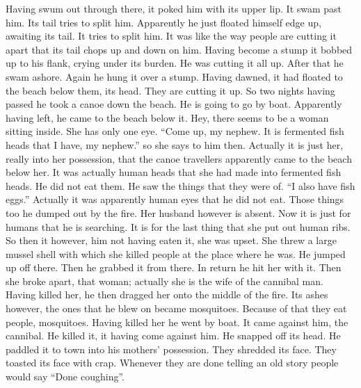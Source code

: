 \begin{pairs}
\begin{Rightside}
Having swum out through there, it poked him with its upper lip.
It swam past him.
Its tail tries to split him.
Apparently he just floated himself edge up, awaiting its tail.
It tries to split him.
It was like the way people are cutting it apart that its tail chops up and down on him.
Having become a stump it bobbed up to his flank, crying under its burden.
He was cutting it all up.
After that he swam ashore.
Again he hung it over a stump.
Having dawned, it had floated to the beach below them, its head.
They are cutting it up.
\pend
\pstart
{}So two nights having passed he took a canoe down the beach.
He is going to go by boat.
Apparently having left, he came to the beach below it.
Hey, there seems to be a woman sitting inside.
She has only one eye.
\qqk{}“Come up, my nephew.
It is fermented fish heads that I have, my nephew.”
so she says to him then.
Actually it is just her, really into her possession, that the canoe travellers apparently came to the beach below her.
It was actually human heads that she had made into fermented fish heads.
He did not eat them.
He saw the things that they were of.
\qqk{}“I also have fish eggs.”
Actually it was apparently human eyes that he did not eat.
Those things too he dumped out by the fire.
Her husband however is absent.
Now it is just for humans that he is searching.
It is for the last thing that she put out human ribs.
So then it however, him not having eaten it, she was upset.
She threw a large mussel shell with which she killed people at the place where he was.
He jumped up off there.
Then he grabbed it from there.
In return he hit her with it.
Then she broke apart, that woman;
actually she is the wife of the cannibal man.
Having killed her, he then dragged her onto the middle of the fire.
Its ashes however, the ones that he blew on became mosquitoes.
Because of that they eat people, mosquitoes.
Having killed her he went by boat.
It came against him, the cannibal.
He killed it, it having come against him.
He snapped off its head.
He paddled it to town into his mothers’ possession.
They shredded its face.
They toasted its face with crap.
\pend
\pstart
{}Whenever they are done telling an old story people would say
\qqk{}“Done coughing”.
\pend
\endnumbering
\end{Rightside}
\end{pairs}
\Columns

